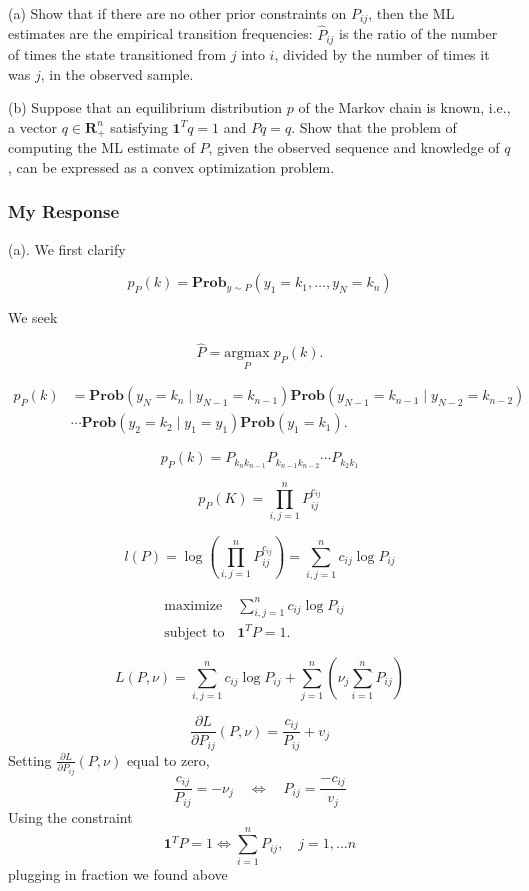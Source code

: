 \documentclass[12pt,reqno]{article}
\theoremstyle{definition}
\numberwithin{equation}{section}
\begin{document}
\vspace{0.1cm}
\noindent (a) Show that if there are no other prior constraints on $P_{i j}$, then the ML estimates are the empirical transition frequencies:
$\hat{P}_{i j}$ is the ratio of the number of times the state transitioned from $j$ into $i$, divided by the number of times it was $j$, in the observed sample.

\vspace{0.1cm}
\noindent (b) Suppose that an equilibrium distribution $p$ of the Markov chain is known, i.e., a vector $q \in \mathbf{R}_{+}^n$ satisfying $\mathbf{1}^T q=1$ and $P q=q$. Show that the problem of computing the ML estimate of $P$,
given the observed sequence and knowledge of $q$, can be expressed as a convex optimization problem.

\subsubsection*{My Response}
\noindent (a). We first clarify

\[p_{P}(k) = \mathbf{Prob}_{y \sim P}\left(y_1 = k_1, \ldots, y_N = k_n\right)\]

We seek

\[\hat{P} = \underset{P}{\mathrm{argmax}} \; p_P(k). \]

\[ \begin{aligned}
    p_{P}(k) &= \mathbf{Prob}\left(y_{N} = k_n \mid y_{N-1} = k_{n-1}\right) \mathbf{Prob}\left(y_{N-1}=k_{n-1} \mid y_{N-2} = k_{n-2} \right)\\
&\cdots \mathbf{Prob}(y_{2} = k_{2} \mid y_{1} = y_{1}) \mathbf{Prob}\left(y_1 = k_1\right).
\end{aligned} \]

\[p_{P}(k) = P_{k_{n}k_{n-1}}P_{k_{n-1}k_{n-2}} \cdots P_{k_{2}k_{1}}\]

\[p_{P}(K) = \prod_{i, j=1}^{n}P_{ij}^{c_{ij}}\]

\[l(P) = \log \left( \prod_{i, j=1}^{n}P_{ij}^{c_{ij}} \right) = \sum_{i, j=1}^{n} c_{ij}\log P_{ij}\]

\[\begin{array}{lll}
\text{maximize} \; & \sum_{i, j=1}^{n} c_{ij}\log P_{ij} & \\
\text{subject to} & \bm{1}^T P = 1.
\end{array}\]

\[L(P, \nu) = \sum_{i, j=1}^{n} c_{ij}\log P_{ij} + \sum_{j=1}^{n} \left(\nu_j \sum_{i=1}^{n}P_{ij} \right)  \]

\[\frac{\partial L}{\partial P_{ij}}(P, \nu) = \frac{c_{ij}}{P_{ij}} + v_{j}\]
Setting $\frac{\partial L}{\partial P_{ij}}(P, \nu)$ equal to zero,
\[\frac{c_{ij}}{P_{ij}} = - \nu_j \quad \Longleftrightarrow \quad P_{ij} = \frac{-c_{ij}}{v_{j}}\]
Using the constraint 
\[\bm{1}^T P = 1 \Longleftrightarrow \sum_{i=1}^{n}P_{ij}, \quad j = 1, \ldots n\]
plugging in fraction we found above
\end{document}
